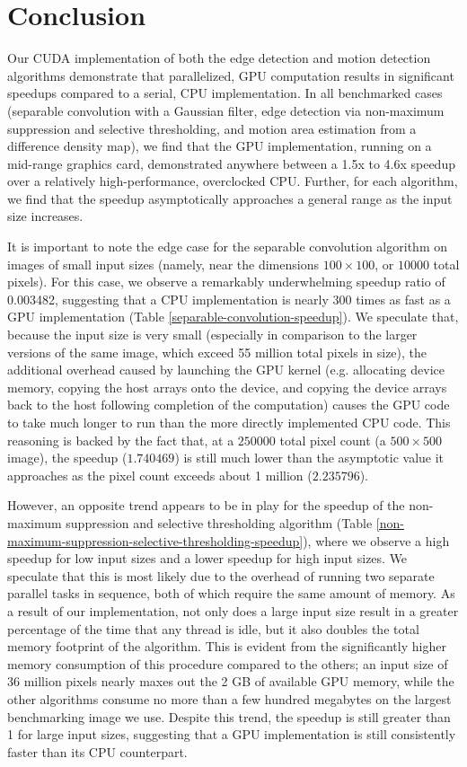 \documentclass[journal]{IEEEtran}
\begin{document}
\section{Conclusion}
Our CUDA implementation of both the edge detection and motion detection algorithms demonstrate that parallelized, GPU computation results in significant speedups compared to a serial, CPU implementation. In all benchmarked cases (separable convolution with a Gaussian filter, edge detection via non-maximum suppression and selective thresholding, and motion area estimation from a difference density map), we find that the GPU implementation, running on a mid-range graphics card, demonstrated anywhere between a 1.5x to 4.6x speedup over a relatively high-performance, overclocked CPU. Further, for each algorithm, we find that the speedup asymptotically approaches a general range as the input size increases.
\par It is important to note the edge case for the separable convolution algorithm on images of small input sizes (namely, near the dimensions $100 \times 100$, or $10000$ total pixels). For this case, we observe a remarkably underwhelming speedup ratio of 0.003482, suggesting that a CPU implementation is nearly 300 times as fast as a GPU implementation (Table \ref{separable-convolution-speedup}). We speculate that, because the input size is very small (especially in comparison to the larger versions of the same image, which exceed 55 million total pixels in size), the additional overhead caused by launching the GPU kernel (e.g. allocating device memory, copying the host arrays onto the device, and copying the device arrays back to the host following completion of the computation) causes the GPU code to take much longer to run than the more directly implemented CPU code. This reasoning is backed by the fact that, at a $250000$ total pixel count (a $500 \times 500$ image), the speedup ($1.740469$) is still much lower than the asymptotic value it approaches as the pixel count exceeds about 1 million ($2.235796$).
\par However, an opposite trend appears to be in play for the speedup of the non-maximum suppression and selective thresholding algorithm (Table \ref{non-maximum-suppression-selective-thresholding-speedup}), where we observe a high speedup for low input sizes and a lower speedup for high input sizes. We speculate that this is most likely due to the overhead of running two separate parallel tasks in sequence, both of which require the same amount of memory. As a result of our implementation, not only does a large input size result in a greater percentage of the time that any thread is idle, but it also doubles the total memory footprint of the algorithm. This is evident from the significantly higher memory consumption of this procedure compared to the others; an input size of 36 million pixels nearly maxes out the 2 GB of available GPU memory, while the other algorithms consume no more than a few hundred megabytes on the largest benchmarking image we use. Despite this trend, the speedup is still greater than 1 for large input sizes, suggesting that a GPU implementation is still consistently faster than its CPU counterpart.
\end{document}
